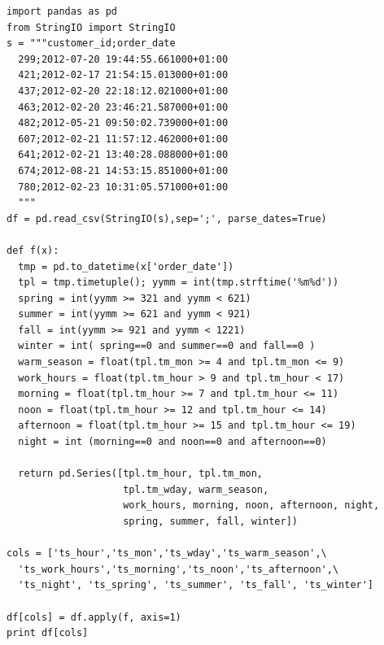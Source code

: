 \documentclass[12pt,fleqn]{article}\usepackage{../../common}
\begin{document}
\begin{verbatim}
import pandas as pd
from StringIO import StringIO
s = """customer_id;order_date
  299;2012-07-20 19:44:55.661000+01:00
  421;2012-02-17 21:54:15.013000+01:00
  437;2012-02-20 22:18:12.021000+01:00
  463;2012-02-20 23:46:21.587000+01:00
  482;2012-05-21 09:50:02.739000+01:00
  607;2012-02-21 11:57:12.462000+01:00
  641;2012-02-21 13:40:28.088000+01:00
  674;2012-08-21 14:53:15.851000+01:00
  780;2012-02-23 10:31:05.571000+01:00
  """
df = pd.read_csv(StringIO(s),sep=';', parse_dates=True)

def f(x):
  tmp = pd.to_datetime(x['order_date'])
  tpl = tmp.timetuple(); yymm = int(tmp.strftime('%m%d'))
  spring = int(yymm >= 321 and yymm < 621)
  summer = int(yymm >= 621 and yymm < 921)
  fall = int(yymm >= 921 and yymm < 1221)
  winter = int( spring==0 and summer==0 and fall==0 )
  warm_season = float(tpl.tm_mon >= 4 and tpl.tm_mon <= 9)
  work_hours = float(tpl.tm_hour > 9 and tpl.tm_hour < 17)
  morning = float(tpl.tm_hour >= 7 and tpl.tm_hour <= 11)
  noon = float(tpl.tm_hour >= 12 and tpl.tm_hour <= 14)
  afternoon = float(tpl.tm_hour >= 15 and tpl.tm_hour <= 19)
  night = int (morning==0 and noon==0 and afternoon==0)

  return pd.Series([tpl.tm_hour, tpl.tm_mon,
                    tpl.tm_wday, warm_season,
                    work_hours, morning, noon, afternoon, night,
                    spring, summer, fall, winter])

cols = ['ts_hour','ts_mon','ts_wday','ts_warm_season',\
  'ts_work_hours','ts_morning','ts_noon','ts_afternoon',\
  'ts_night', 'ts_spring', 'ts_summer', 'ts_fall', 'ts_winter']

df[cols] = df.apply(f, axis=1)
print df[cols]
\end{verbatim}
\end{document}
